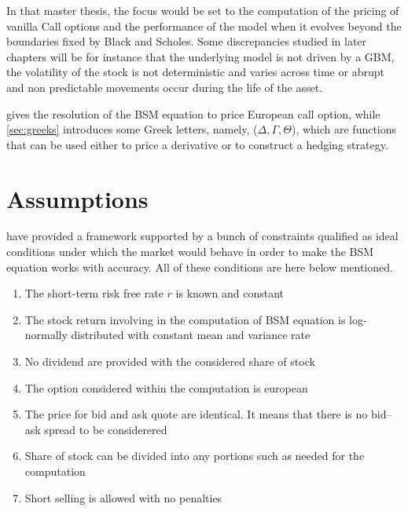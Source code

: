 \documentclass[a4paper, 12pt]{report}
\begin{document}
In that master thesis, the focus would be set to the computation of the pricing of vanilla Call options and the performance of the model when it evolves beyond the boundaries fixed by Black and Scholes. 
Some discrepancies studied in later chapters will be for instance that the underlying model is not driven by a GBM, the volatility of the stock is not deterministic and varies across time or abrupt and non predictable movements occur during the life of the asset.



 gives the resolution of the BSM equation to price European call option, while \cref{sec:greeks} introduces some Greek letters, namely, ($\Delta, \Gamma, \Theta$), which are functions that can be used either to price a derivative or to construct a hedging strategy.



\section{Assumptions}
\label{sec:bsm:assumptions}

\citet{bs} have provided a framework supported by a bunch of constraints qualified as ideal conditions under which the market would behave in order to make the BSM equation works with accuracy. All of these conditions are here below mentioned.

\begin{enumerate}
  \item The short-term risk free rate $r$ is known and constant
  \item The stock return involving in the computation of BSM equation is log-normally distributed with constant mean and variance rate
  \item No dividend are provided with the considered share of stock
  \item The option considered within the computation is european
  \item The price for bid and ask quote are identical. It means that there is no bid--ask spread to be considerered
  \item Share of stock can be divided into any portions such as needed for the computation
  \item Short selling is allowed with no penalties
\end{enumerate}
\end{document}
